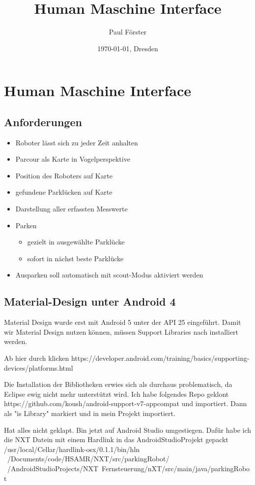 \documentclass[../documentation.tex]{subfiles}
\title{Human Maschine Interface}
\author{Paul Förster}
\date{\today{}, Dresden}
\begin{document}
\onlyinsubfile{\maketitle\tableofcontents}
\section{Human Maschine Interface}

\subsection{Anforderungen}
\label{sec:anforderungen}

\begin{itemize}
\item Roboter lässt sich zu jeder Zeit anhalten
\item Parcour als Karte in Vogelperspektive
\item Position des Roboters auf Karte
\item gefundene Parklücken auf Karte
\item Darstellung aller erfassten Messwerte
\item Parken
\begin{itemize}
\item gezielt in ausgewählte Parklücke
\item sofort in nächst beste Parklücke
\end{itemize}
\item Ausparken soll automatisch mit scout-Modus aktiviert werden
\end{itemize}

\subsection{Material-Design unter Android 4}
\label{sec:materialdesignunterandroid4}

Material Design wurde erst mit Android 5 unter der API 25 eingeführt. Damit wir Material Design nutzen können, müssen Support Libraries nach installiert werden.

Ab hier durch klicken https://developer.android.com/training/basics/supporting-devices/platforms.html

Die Installation der Bibliotheken erwies sich als durchaus problematisch, da Eclipse ewig nicht mehr unterstützt wird.
Ich habe folgendes Repo geklont https://github.com/koush/android-support-v7-appcompat und importiert. Dann als "is Library" markiert und in mein Projekt importiert.

Hat alles nicht geklapt. Bin jetzt auf Android Studio umgestiegen. Dafür habe ich die NXT Datein mit einem Hardlink in das AndroidStudioProjekt gepackt /usr/local/Cellar/hardlink-osx/0.1.1/bin/hln ~/Documents/code/HSAMR/NXT/src/parkingRobot/ ~/AndroidStudioProjects/NXT\ Fernsteuerung/nXT/src/main/java/parkingRobot
\end{document}
